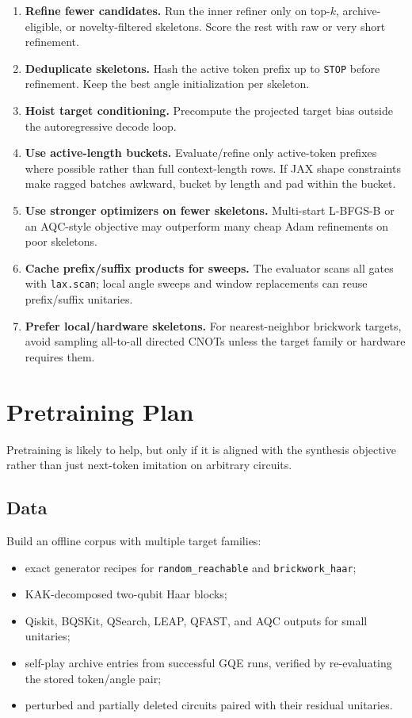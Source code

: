 \documentclass[11pt]{article}
\begin{document}
\begin{enumerate}
  \item \textbf{Refine fewer candidates.}  Run the inner refiner only on
  top-\(k\), archive-eligible, or novelty-filtered skeletons.  Score the rest
  with raw or very short refinement.
  \item \textbf{Deduplicate skeletons.}  Hash the active token prefix up to
  \texttt{STOP} before refinement.  Keep the best angle initialization per
  skeleton.
  \item \textbf{Hoist target conditioning.}  Precompute the projected target
  bias outside the autoregressive decode loop.
  \item \textbf{Use active-length buckets.}  Evaluate/refine only active-token
  prefixes where possible rather than full context-length rows.  If JAX shape
  constraints make ragged batches awkward, bucket by length and pad within the
  bucket.
  \item \textbf{Use stronger optimizers on fewer skeletons.}  Multi-start
  L-BFGS-B or an AQC-style objective may outperform many cheap Adam refinements
  on poor skeletons.
  \item \textbf{Cache prefix/suffix products for sweeps.}  The evaluator scans
  all gates with \texttt{lax.scan}; local angle sweeps and window replacements
  can reuse prefix/suffix unitaries.
  \item \textbf{Prefer local/hardware skeletons.}  For nearest-neighbor
  brickwork targets, avoid sampling all-to-all directed CNOTs unless the target
  family or hardware requires them.
\end{enumerate}

\section{Pretraining Plan}

Pretraining is likely to help, but only if it is aligned with the synthesis
objective rather than just next-token imitation on arbitrary circuits.

\subsection{Data}

Build an offline corpus with multiple target families:
\begin{itemize}
  \item exact generator recipes for \texttt{random\_reachable} and
  \texttt{brickwork\_haar};
  \item KAK-decomposed two-qubit Haar blocks;
  \item Qiskit, BQSKit, QSearch, LEAP, QFAST, and AQC outputs for small
  unitaries;
  \item self-play archive entries from successful GQE runs, verified by
  re-evaluating the stored token/angle pair;
  \item perturbed and partially deleted circuits paired with their residual
  unitaries.
\end{itemize}
\end{document}
